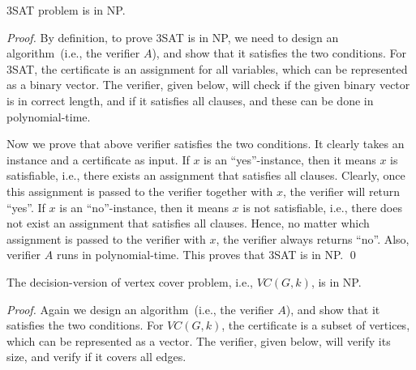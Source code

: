 \begin{fact}
3SAT problem is in NP.
\end{fact}
\emph{Proof.} By definition, to prove 3SAT is in NP, we need to design an
algorithm~(i.e., the verifier $A$), and show that it satisfies the two
conditions. For 3SAT, the certificate is an assignment for all variables,
which can be represented as a binary vector. The verifier, given below, will check
if the given binary vector is in correct length, and if it satisfies all clauses,
and these can be done in polynomial-time.

\begin{algorithmblock}[0.8\textwidth]
	\xxx
	\xxx
	\xxx
	\xxx
\end{algorithmblock}

Now we prove that above verifier satisfies the two conditions.
It clearly takes an instance and a certificate as input.
If $x$ is an ``yes''-instance, then it means $x$ is satisfiable, i.e.,
there exists an assignment that satisfies all clauses.
Clearly, once this assignment is passed to the verifier together with $x$,
the verifier will return ``yes''.
If $x$ is an ``no''-instance, then it means $x$ is not satisfiable, i.e.,
there does not exist an assignment that satisfies all clauses.
Hence, no matter which assignment is passed to the verifier with $x$,
the verifier always returns ``no''. Also, verifier $A$ runs in polynomial-time.
This proves that 3SAT is in NP.
\qed


\begin{fact}
The decision-version of vertex cover problem, i.e., $VC(G, k)$, is in NP.
\end{fact}

\emph{Proof.} Again we design an algorithm~(i.e., the verifier $A$), and show that it satisfies the two
conditions. For $VC(G, k)$, the certificate is a subset of vertices, which
can be represented as a vector.
The verifier, given below, will verify its size, and verify if it covers all edges.

\begin{algorithmblock}[0.8\textwidth]
	\xxx
	\xxx
	\xxx
	\xxx
\end{algorithmblock}

